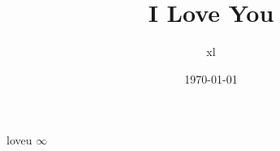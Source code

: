 \documentclass{article}
\title{I Love You}
\author{xl}
\date{\today} %
\begin{document}
\maketitle
loveu
$\infty$
\end{document}
